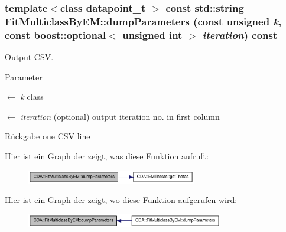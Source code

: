 \hypertarget{classCDA_1_1FitMulticlassByEM_aa5598f1ced5c95045f59c99610ab53e5}{
\subsubsection[{dumpParameters}]{\setlength{\rightskip}{0pt plus 5cm}template$<$class datapoint\_\-t $>$ const std::string FitMulticlassByEM::dumpParameters (const unsigned {\em k}, \/  const boost::optional$<$ unsigned int $>$ {\em iteration}) const}}
\label{classCDA_1_1FitMulticlassByEM_aa5598f1ced5c95045f59c99610ab53e5}


Output CSV. 


\begin{DoxyParams}{Parameter}
\item[\mbox{$\leftarrow$} {\em k}]class \item[\mbox{$\leftarrow$} {\em iteration}](optional) output iteration no. in first column\end{DoxyParams}
\begin{DoxyReturn}{Rückgabe}
one CSV line 
\end{DoxyReturn}


Hier ist ein Graph der zeigt, was diese Funktion aufruft:\nopagebreak
\begin{figure}[H]
\begin{center}
\leavevmode
\includegraphics[width=210pt]{classCDA_1_1FitMulticlassByEM_aa5598f1ced5c95045f59c99610ab53e5_cgraph}
\end{center}
\end{figure}




Hier ist ein Graph der zeigt, wo diese Funktion aufgerufen wird:\nopagebreak
\begin{figure}[H]
\begin{center}
\leavevmode
\includegraphics[width=244pt]{classCDA_1_1FitMulticlassByEM_aa5598f1ced5c95045f59c99610ab53e5_icgraph}
\end{center}
\end{figure}


